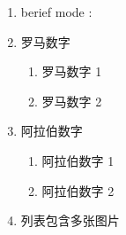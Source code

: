 \documentclass[a4paper,11pt,onecolumn]{article}
\begin{document}
\begin{enumerate}
\def\labelenumi{\arabic{enumi}.}

\setlength{\itemsep}{5pt}
\setlength{\partopsep}{0pt}
\setlength{\topsep}{5pt}

\item
  berief mode : 
\item
  罗马数字
  \begin{enumerate}[label={(\roman*).}]
    \item
      罗马数字 1
    \item
      罗马数字 2
  \end{enumerate}
\item
  阿拉伯数字
  \begin{enumerate}[label={\arabic*.}]
    \item
      阿拉伯数字 1
    \item
      阿拉伯数字 2
  \end{enumerate}
\item
  列表包含多张图片


\end{enumerate}
\end{document}
